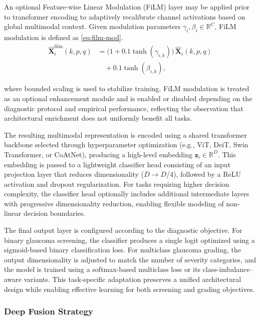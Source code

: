 \documentclass[preprint,12pt]{elsarticle}
\newcommand{\eqrefp}[1]{\eqref{#1}}
\begin{document}
An optional Feature-wise Linear Modulation (FiLM) layer may be applied prior to transformer encoding to adaptively recalibrate channel activations based on global multimodal context. Given modulation parameters $\gamma_i, \beta_i \in \mathbb{R}^C$, FiLM modulation is defined as \eqrefp{eq:film-mod}.
\begin{equation}
    \begin{aligned}
        \hat{\mathbf{X}}_i^{\text{film}}(k,p,q)
         & =
        \bigl(1 + 0.1\tanh(\gamma_{i,k})\bigr)\,
        \hat{\mathbf{X}}_i(k,p,q)         \\
         & \quad + 0.1\tanh(\beta_{i,k}),
    \end{aligned}
    \label{eq:film-mod}
\end{equation}

where bounded scaling is used to stabilize training. FiLM modulation is treated as an optional enhancement module and is enabled or disabled depending on the diagnostic protocol and empirical performance, reflecting the observation that architectural enrichment does not uniformly benefit all tasks.

The resulting multimodal representation is encoded using a shared transformer backbone selected through hyperparameter optimization (e.g., ViT, DeiT, Swin Transformer, or CoAtNet), producing a high-level embedding $\mathbf{z}_i \in \mathbb{R}^D$. This embedding is passed to a lightweight classifier head consisting of an input projection layer that reduces dimensionality ($D \rightarrow D/4$), followed by a ReLU activation and dropout regularization. For tasks requiring higher decision complexity, the classifier head optionally includes additional intermediate layers with progressive dimensionality reduction, enabling flexible modeling of non-linear decision boundaries.

The final output layer is configured according to the diagnostic objective. For binary glaucoma screening, the classifier produces a single logit optimized using a sigmoid-based binary classification loss. For multiclass glaucoma grading, the output dimensionality is adjusted to match the number of severity categories, and the model is trained using a softmax-based multiclass loss or its class-imbalance–aware variants. This task-specific adaptation preserves a unified architectural design while enabling effective learning for both screening and grading objectives.


\subsubsection{Deep Fusion Strategy}
\label{subsubsec-deepfusion}
\end{document}
